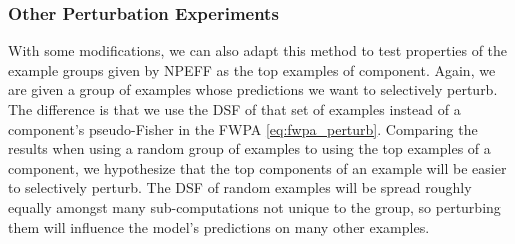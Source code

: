 \documentclass[dvipsnames]{article}
\begin{document}
\subsubsection{Other Perturbation Experiments}\label{sec:other_pert_exps_methods}

With some modifications, we can also adapt this method to test properties of the example groups given by NPEFF as the top examples of component.
Again, we are given a group of examples whose predictions we want to selectively perturb.
The difference is that we use the DSF of that set of examples instead of a component's pseudo-Fisher in the FWPA \eqref{eq:fwpa_perturb}.
Comparing the results when using a random group of examples to using the top examples of a component, we hypothesize that the top components of an example will be easier to selectively perturb.
The DSF of random examples will be spread roughly equally amongst many sub-computations not unique to the group, so perturbing them will influence the model's predictions on many other examples.






\end{document}

